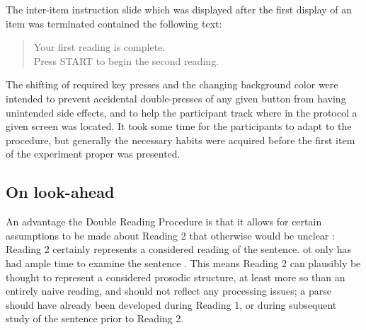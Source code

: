 \documentclass[12pt,oneside]{book}
\begin{document}
The inter-item instruction slide which was displayed after the first display of an item was terminated contained the following text:

\begin{quotation}
Your first reading is complete.\\
Press START to begin the second reading.
\end{quotation}

The shifting of required key presses and the changing background color were intended to prevent accidental double-presses of any given button from having unintended side effects, and to help the participant track where in the protocol a given screen was located. It took some time for the participants to adapt to the procedure, but generally the necessary habits were acquired before the first item of the experiment proper was presented.

\hypertarget{look-ahead}{%
\subsection{On look-ahead}\label{look-ahead}}

An advantage  the Double Reading Procedure  is that it allows for certain assumptions to be made about Reading 2  that otherwise would be unclear : Reading 2 certainly represents a considered reading of the sentence. ot only has  had ample time to examine the sentence . This means Reading 2 can plausibly be thought to represent a considered prosodic  structure, at least more so than an entirely naive reading, and should not reflect any processing issues; a parse should have already been developed during Reading 1, or during subsequent study of the sentence prior to Reading 2.
\end{document}
